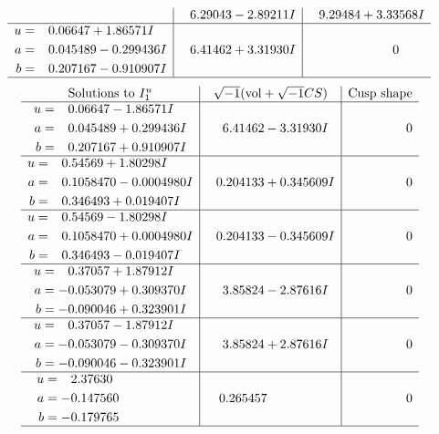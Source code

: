\documentclass[1p]{elsarticle_modified}
\theoremstyle{definition}
\newcommand{\I}{\sqrt{-1}}
\begin{document}
$$\begin{array}{c|c|c}
 & \phantom{-}6.29043 - 2.89211 I & \phantom{-}9.29484 + 3.33568 I \\ \hline\begin{aligned}
u &= \phantom{-}0.06647 + 1.86571 I \\
a &= \phantom{-}0.045489 - 0.299436 I \\
b &= \phantom{-}0.207167 - 0.910907 I\end{aligned}
 & \phantom{-}6.41462 + 3.31930 I & \phantom{-0.000000 } 0\\
 \hline 
 \end{array}$$\newpage$$\begin{array}{c|c|c}  
\text{Solutions to }I^u_{1}& \I (\text{vol} + \sqrt{-1}CS) & \text{Cusp shape}\\
 \hline 
\begin{aligned}
u &= \phantom{-}0.06647 - 1.86571 I \\
a &= \phantom{-}0.045489 + 0.299436 I \\
b &= \phantom{-}0.207167 + 0.910907 I\end{aligned}
 & \phantom{-}6.41462 - 3.31930 I & \phantom{-0.000000 } 0 \\ \hline\begin{aligned}
u &= \phantom{-}0.54569 + 1.80298 I \\
a &= \phantom{-}0.1058470 - 0.0004980 I \\
b &= \phantom{-}0.346493 + 0.019407 I\end{aligned}
 & \phantom{-}0.204133 + 0.345609 I & \phantom{-0.000000 } 0 \\ \hline\begin{aligned}
u &= \phantom{-}0.54569 - 1.80298 I \\
a &= \phantom{-}0.1058470 + 0.0004980 I \\
b &= \phantom{-}0.346493 - 0.019407 I\end{aligned}
 & \phantom{-}0.204133 - 0.345609 I & \phantom{-0.000000 } 0 \\ \hline\begin{aligned}
u &= \phantom{-}0.37057 + 1.87912 I \\
a &= -0.053079 + 0.309370 I \\
b &= -0.090046 + 0.323901 I\end{aligned}
 & \phantom{-}3.85824 - 2.87616 I & \phantom{-0.000000 } 0 \\ \hline\begin{aligned}
u &= \phantom{-}0.37057 - 1.87912 I \\
a &= -0.053079 - 0.309370 I \\
b &= -0.090046 - 0.323901 I\end{aligned}
 & \phantom{-}3.85824 + 2.87616 I & \phantom{-0.000000 } 0 \\ \hline\begin{aligned}
u &= \phantom{-}2.37630\phantom{ +0.000000I} \\
a &= -0.147560\phantom{ +0.000000I} \\
b &= -0.179765\phantom{ +0.000000I}\end{aligned}
 & \phantom{-}0.265457\phantom{ +0.000000I} & \phantom{-0.000000 } 0\\
 \hline 
 \end{array}$$\newpage\newpage\renewcommand{\arraystretch}{1}
\end{document}
